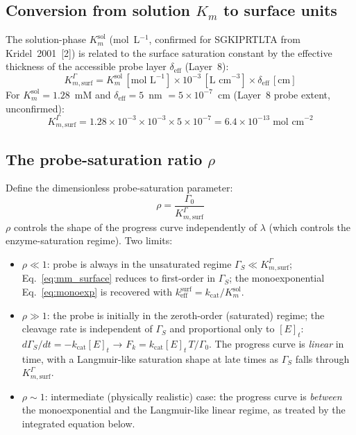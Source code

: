 \documentclass[10pt,a4paper]{article}
\numberwithin{equation}{section}
\newcommand{\cit}[1]{[#1]}
\newcommand{\kcat}{k_{\text{cat}}}
\newcommand{\keff}{k_{\text{eff}}}
\newcommand{\GS}{\Gamma_S}
\newcommand{\Gz}{\Gamma_0}
\begin{document}
\subsection{Conversion from solution $K_m$ to surface units}

The solution-phase $K_m^{\text{sol}}$ (mol~L$^{-1}$, confirmed for
SGKIPRTLTA from Kridel~2001~\cit{2}) is related to the surface saturation
constant by the effective thickness of the accessible probe layer $\delta_{\text{eff}}$
(Layer~8):
\begin{equation}
  K_{m,\text{surf}}^\Gamma
  = K_m^{\text{sol}}\,[\text{mol~L}^{-1}]
    \times 10^{-3}\,[\text{L~cm}^{-3}]
    \times \delta_{\text{eff}}\,[\text{cm}]
  \label{eq:Kmsurf}
\end{equation}
For $K_m^{\text{sol}} = 1.28$~mM and $\delta_{\text{eff}} = 5$~nm $= 5\times10^{-7}$~cm
(Layer~8 probe extent, unconfirmed):
\begin{equation}
  K_{m,\text{surf}}^\Gamma
  = 1.28\times10^{-3} \times 10^{-3} \times 5\times10^{-7}
  = 6.4\times10^{-13}\;\text{mol~cm}^{-2}
  \label{eq:Kmsurf_val}
\end{equation}

\subsection{The probe-saturation ratio $\rho$}

Define the dimensionless probe-saturation parameter:
\begin{equation}
  \rho = \frac{\Gz}{K_{m,\text{surf}}^\Gamma}
  \label{eq:rho}
\end{equation}
$\rho$ controls the shape of the progress curve independently of $\lambda$
(which controls the enzyme-saturation regime). Two limits:
\begin{itemize}[noitemsep]
  \item $\rho \ll 1$: probe is always in the unsaturated regime
    $\GS \ll K_{m,\text{surf}}^\Gamma$; Eq.~\eqref{eq:mm_surface} reduces to
    first-order in $\GS$; the monoexponential Eq.~\eqref{eq:monoexp} is
    recovered with $\keff^{\text{surf}} = \kcat/K_m^{\text{sol}}$.
  \item $\rho \gg 1$: the probe is initially in the zeroth-order (saturated)
    regime; the cleavage rate is independent of $\GS$ and proportional only
    to $[E]_t$: $d\GS/dt = -\kcat[E]_t$ → $F_k = \kcat[E]_t\,T/\Gz$.
    The progress curve is \emph{linear} in time, with a Langmuir-like saturation
    shape at late times as $\GS$ falls through $K_{m,\text{surf}}^\Gamma$.
  \item $\rho \sim 1$: intermediate (physically realistic) case: the progress
    curve is \emph{between} the monoexponential and the Langmuir-like linear
    regime, as treated by the integrated equation below.
\end{itemize}
\end{document}
